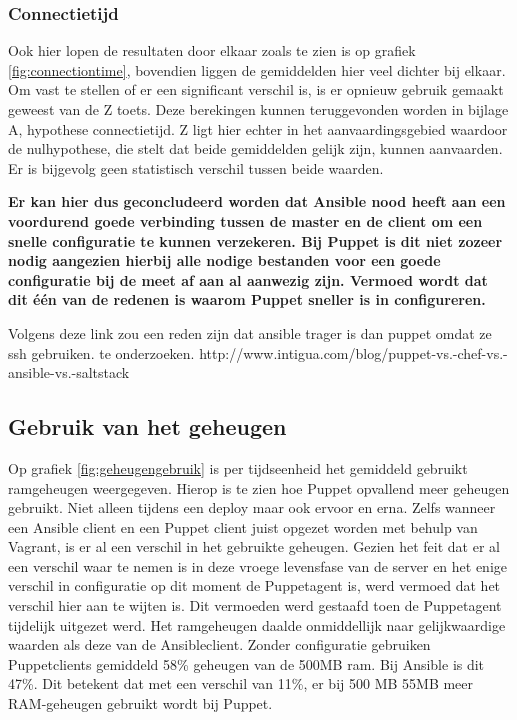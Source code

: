 \subsubsection{Connectietijd}
Ook hier lopen de resultaten door elkaar zoals te zien is op grafiek \ref{fig:connectiontime}, bovendien liggen de gemiddelden hier veel dichter bij elkaar. Om vast te stellen of er een significant verschil is, is er opnieuw gebruik gemaakt geweest van de Z toets. Deze berekingen kunnen teruggevonden worden in bijlage A, hypothese connectietijd. Z ligt hier echter in het aanvaardingsgebied waardoor de nulhypothese, die stelt dat beide gemiddelden gelijk zijn, kunnen aanvaarden. Er is bijgevolg geen statistisch verschil tussen beide waarden.

\textbf{Er kan hier dus geconcludeerd worden dat Ansible nood heeft aan een voordurend goede verbinding tussen de master en de client om een snelle configuratie te kunnen verzekeren. Bij Puppet is dit niet zozeer nodig aangezien hierbij alle nodige bestanden voor een goede configuratie bij de meet af aan al aanwezig zijn. Vermoed wordt dat dit \'e\'en van de redenen is waarom Puppet sneller is in configureren.}

 {\color{red}Volgens deze link zou een reden zijn dat ansible trager is dan puppet omdat ze ssh gebruiken. te onderzoeken. http://www.intigua.com/blog/puppet-vs.-chef-vs.-ansible-vs.-saltstack}





\subsection{Gebruik van het geheugen}

Op grafiek \ref{fig:geheugengebruik} is per tijdseenheid het gemiddeld gebruikt ramgeheugen weergegeven. Hierop is te zien hoe Puppet opvallend meer geheugen gebruikt. Niet alleen tijdens een deploy maar ook ervoor en erna. Zelfs wanneer een Ansible client en een Puppet client juist opgezet worden met behulp van Vagrant, is er al een verschil in het gebruikte geheugen. Gezien het feit dat er al een verschil waar te nemen is in deze vroege levensfase van de server en het enige verschil in configuratie op dit moment de Puppetagent is, werd vermoed dat het verschil hier aan te wijten is. Dit vermoeden werd gestaafd toen de Puppetagent tijdelijk uitgezet werd. Het ramgeheugen daalde onmiddellijk naar gelijkwaardige waarden als deze van de Ansibleclient. Zonder configuratie gebruiken Puppetclients gemiddeld 58\% geheugen van de 500MB ram. Bij Ansible is dit 47\%. Dit betekent dat met een verschil van 11\%, er bij 500 MB 55MB meer RAM-geheugen gebruikt wordt bij Puppet.

